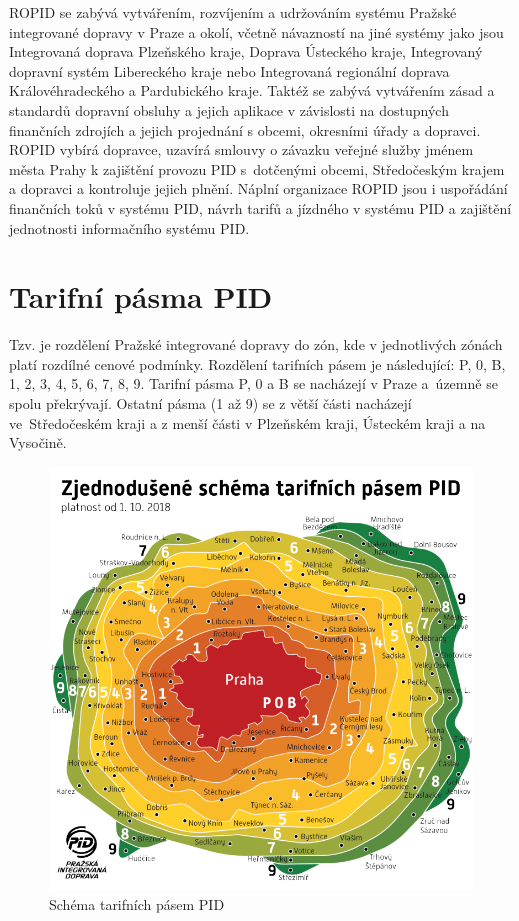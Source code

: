 ROPID se zabývá vytvářením, rozvíjením a udržováním systému Pražské integrované dopravy v Praze a okolí,
včetně návazností na jiné systémy jako jsou Integrovaná doprava Plzeňského kraje,
Doprava Ústeckého kraje, Integrovaný dopravní systém Libereckého kraje nebo 
Integrovaná regionální doprava Královéhradeckého a Pardubického kraje.
Taktéž se zabývá vytvářením zásad a standardů dopravní obsluhy a jejich aplikace v závislosti
na dostupných finančních zdrojích a jejich projednání s obcemi, okresními úřady a dopravci.
ROPID vybírá dopravce, uzavírá smlouvy o závazku veřejné služby jménem města Prahy 
k zajištění provozu PID s~dotčenými obcemi, Středočeským krajem a dopravci a kontroluje jejich plnění.
Náplní organizace ROPID jsou i uspořádání finančních toků v systému PID, návrh tarifů a jízdného v systému PID a
zajištění jednotnosti informačního systému PID.  \cite{wikipedia-ropid}

\section{Tarifní pásma PID}
                    
Tzv.  je rozdělení Pražské integrované dopravy do zón, kde v jednotlivých
zónách platí rozdílné cenové podmínky. Rozdělení tarifních pásem je následující:
P, 0, B, 1, 2, 3, 4, 5, 6, 7, 8, 9. Tarifní pásma P, 0 a B se nacházejí v Praze a~územně
se spolu překrývají. Ostatní pásma (1 až 9) se z větší části nacházejí ve~Středočeském kraji a z
menší části v Plzeňském kraji, Ústeckém kraji a na Vysočině.

\begin{figure}[H] \centering
    \includegraphics[width=350pt]{./pictures/pasma-schema.png}
    \caption[Schéma tarifních pásem PID]{Schéma tarifních pásem PID \cite{pid}}
	\label{fig:pasma-schema}                                
\end{figure}

